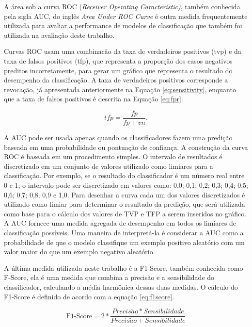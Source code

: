 A área sob a curva ROC (\textit{Receiver Operating Caracteristic)}, também conhecida pela sigla AUC, do inglês \textit{Area Under ROC Curve} é outra medida frequentemente utilizada para avaliar a performance de modelos de classificação que também foi utilizada na avaliação deste trabalho. 

Curvas ROC usam uma combinacão da taxa de verdadeiros positivos (tvp) e da taxa de falsos positivos (tfp), que representa a proporção dos casos negativos preditos incorretamente, para gerar um gráfico que representa o resultado do desempenho da classificação. A taxa de verdadeiros positivos corresponde a revocação, já apresentada anteriormente na Equação \ref{eq:sensitivity}, enquanto que a taxa de falsos positivos é descrita na Equação \ref{eq:fpr}:

\begin{equation} \label{eq:fpr}
tfp = \frac{fp}{fp+vn}.
\end{equation}

A AUC pode ser usada apenas quando os classificadores fazem uma predição baseada em uma probabilidade ou pontuação de confiança. A construção da curva ROC é baseada em um procedimento simples. O intervalo de resultados é discretizado em um conjunto de valores utilizado como limiares para a classificação. Por exemplo, se o resultado do classificador é um número real entre 0 e 1, o intervalo pode ser discretizado em valores como: 0,0; 0,1; 0,2; 0,3; 0,4; 0,5; 0,6; 0,7; 0,8; 0,9 e 1,0. Para desenhar a curva cada um dos valores discretizados é utilizado como limiar para determinar o resultado da predição, que será utilizada como base para o cálculo dos valores de TVP e TFP a serem inseridos no gráfico. A AUC fornece uma medida agregada de desempenho em todos os limiares de classificação possíveis. Uma maneira de interpretá-la é considerar a AUC como a probabilidade de que o modelo classifique um exemplo positivo aleatório com um valor maior do que um exemplo negativo aleatório.

A última medida utilizada neste trabalho é a F1-Score, também conhecida como F-Score, ela é uma medida que combina a precisão e a sensibilidade do classificador, calculando a média harmônica dessas duas medidas. O cálculo do F1-Score é definido de acordo com a equação \ref{eq:f1score}.

\begin{equation} \label{eq:f1score}
\mbox{F1-Score} = 2 * \frac{Precis\tilde{a}o * Sensibilidade}{Precis\tilde{a}o + Sensibilidade}
\end{equation}


